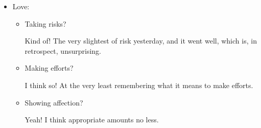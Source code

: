 \documentclass[12pt]{article}
\renewcommand{\,}{\textsuperscript{,}}
\begin{document}
\begin{enumerate}
\begin{itemize}
\begin{itemize}
\item Making graphs?

\begin{itemize}

\item Visual depiction of Latin Hypercube

\item Visual depiction of Grid Search

\item Visual depiction of random search

\item Visual depiction of Loomis-Wood Diagrams

\item Visual depiction of Spectral Stacking

\item Visual depiction of how the fitness of the spectral stacks is really reliant on the graphs being the right height

\item I guess that the stuff for intro to quantum video counts here.

\item Ope! Plots from the actual results of the runs, to make sure that it worked out.\footnote{SSC, AAT, if any vib states were good, what happened to the computations, etc}. Post-it time.

\end{itemize}

\item Organizing citations?

Hah.

\end{itemize}

\item Love:

\begin{itemize}

\item Taking risks?

Kind of! The very slightest of risk yesterday, and it went well, which is, in retrospect, unsurprising.

\item Making efforts?

I think so! At the very least remembering what it means to make efforts.

\item Showing affection?

Yeah! I think appropriate amounts no less.


\end{itemize}
\end{itemize}
\end{enumerate}
\end{document}
